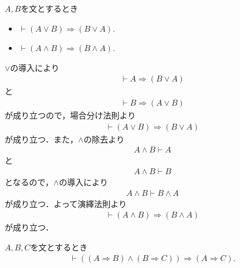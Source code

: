 	
	\begin{screen}
		\begin{logicalthm}
		\label{logicalthm:commutative_law_of_disjunction_and_conjunction}
			$A,B$を文とするとき
			\begin{itemize}
				\item $\vdash (A \vee B) \Longrightarrow (B \vee A)$.
				\item $\vdash (A \wedge B) \Longrightarrow (B \wedge A)$.
			\end{itemize}
		\end{logicalthm}
	\end{screen}
	
	\begin{prf}
		$\vee$の導入により
		\begin{align}
			\vdash A \Longrightarrow (B \vee A)
		\end{align}
		と
		\begin{align}
			\vdash B \Longrightarrow (A \vee B)
		\end{align}
		が成り立つので，場合分け法則より
		\begin{align}
			\vdash (A \vee B) \Longrightarrow (B \vee A)
		\end{align}
		が成り立つ．また，$\wedge$の除去より
		\begin{align}
			A \wedge B \vdash A
		\end{align}
		と
		\begin{align}
			A \wedge B \vdash B
		\end{align}
		となるので，$\wedge$の導入により
		\begin{align}
			A \wedge B \vdash B \wedge A
		\end{align}
		が成り立つ．よって演繹法則より
		\begin{align}
			\vdash (A \wedge B) \Longrightarrow (B \wedge A)
		\end{align}
		が成り立つ．
		\QED
	\end{prf}
	
	\begin{screen}
		\begin{logicalthm}[含意の推移律]\label{logicalthm:transitive_law_of_implication}
			$A,B,C$を文とするとき
			\begin{align}
				\vdash ((A \Longrightarrow B) \wedge (B \Longrightarrow C)) 
				\Longrightarrow (A \Longrightarrow C).
			\end{align}
		\end{logicalthm}
	\end{screen}
	
